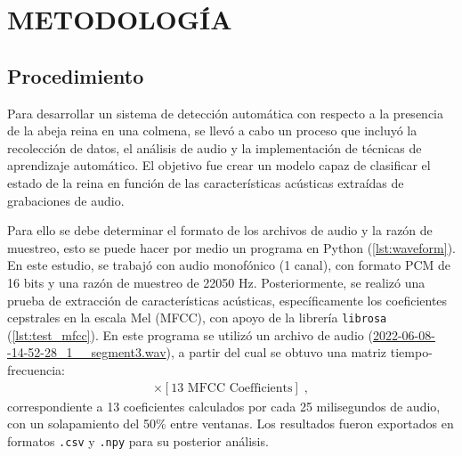\documentclass[12pt]{report}
\newenvironment{tightmulticols}{%
  \begin{multicols}{2}
  \setlength{\parskip}{0pt}
  \setlength{\parindent}{0em}
  \linespread{1}\selectfont
}{%
  \end{multicols}
}
\begin{document}

\pagebreak
\chapter{METODOLOGÍA}
\vspace{-3em}

\begin{tightmulticols}

\section{Procedimiento}

\par Para desarrollar un sistema de detección automática con respecto a la presencia de la abeja reina en una colmena, se llevó a cabo un proceso que incluyó la recolección de datos, el análisis de audio y la implementación de técnicas de aprendizaje automático. El objetivo fue crear un modelo capaz de clasificar el estado de la reina en función de las características acústicas extraídas de grabaciones de audio.

\par Para ello se debe determinar el formato de los archivos de audio y la razón de muestreo, esto se puede hacer por medio un programa en Python (\ref{lst:waveform}). En este estudio, se trabajó con audio monofónico (1 canal), con formato PCM de 16 bits y una razón de muestreo de 22050 Hz. Posteriormente, se realizó una prueba de extracción de características acústicas, específicamente los coeficientes cepstrales en la escala Mel (MFCC), con apoyo de la librería \texttt{librosa} (\ref{lst:test_mfcc}). En este programa se utilizó un archivo de audio (\url{2022-06-08--14-52-28_1__segment3.wav}), a partir del cual se obtuvo una matriz tiempo-frecuencia:
\begin{align*}
[\text{Time Frames}] \times [\text{13 MFCC Coefficients}] \; ,
\end{align*}
correspondiente a 13 coeficientes calculados por cada 25 milisegundos de audio, con un solapamiento del 50\% entre ventanas. Los resultados fueron exportados en formatos \texttt{.csv} y \texttt{.npy} para su posterior análisis.


\end{tightmulticols}
\end{document}
